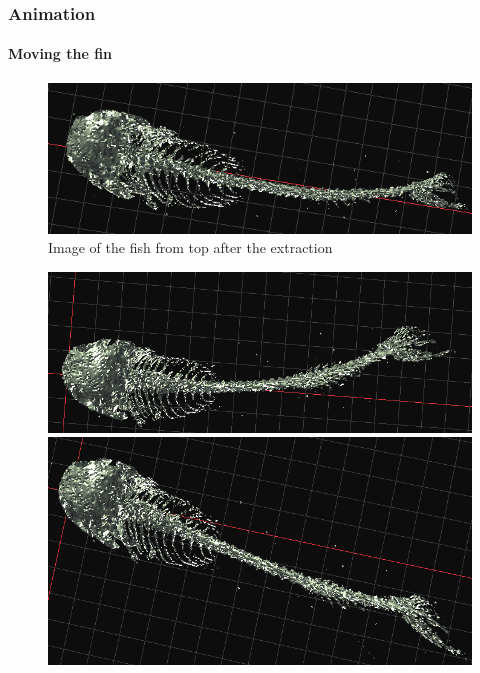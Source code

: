 \documentclass[9pt]{beamer}
\begin{document}
\begin{frame}
\frametitle{Animation}
\framesubtitle{Moving the fin}
\begin{figure}
\includegraphics[scale=0.3]{Images/fish_from_top}
\caption{Image of the fish from top after the extraction}
\end{figure}
\begin{figure}
\centering
\begin{minipage}{.5\textwidth}
  \centering
  \includegraphics[scale=0.2]{Images/left_fin}
\end{minipage}%
\begin{minipage}{.5\textwidth}
  \centering
  \includegraphics[scale=0.22]{Images/right_fin}
\end{minipage}
\end{figure}
\end{frame}
\end{document}

